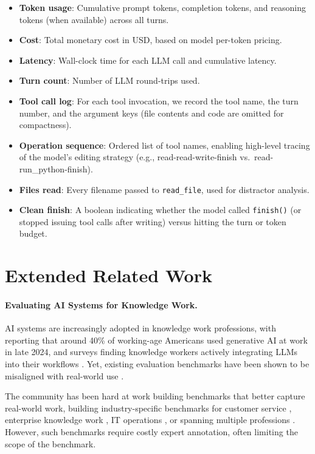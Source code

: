 \documentclass{article} %
\begin{document}
\begin{itemize}
    \item \textbf{Token usage}: Cumulative prompt tokens, completion tokens, and reasoning tokens (when available) across all turns.
    \item \textbf{Cost}: Total monetary cost in USD, based on model per-token pricing.
    \item \textbf{Latency}: Wall-clock time for each LLM call and cumulative latency.
    \item \textbf{Turn count}: Number of LLM round-trips used.
    \item \textbf{Tool call log}: For each tool invocation, we record the tool name, the turn number, and the argument keys (file contents and code are omitted for compactness).
    \item \textbf{Operation sequence}: Ordered list of tool names, enabling high-level tracing of the model's editing strategy (e.g., read-read-write-finish vs.\ read-run\_python-finish).
    \item \textbf{Files read}: Every filename passed to \texttt{read\_file}, used for distractor analysis.
    \item \textbf{Clean finish}: A boolean indicating whether the model called \texttt{finish()} (or stopped issuing tool calls after writing) versus hitting the turn or token budget.
\end{itemize}


\section{Extended Related Work} \label{app:extended_rel_work}

\paragraph{Evaluating AI Systems for Knowledge Work.}

AI systems are increasingly adopted in knowledge work professions, with \citet{Bick2024TheRA} reporting that around 40\% of working-age Americans used generative AI at work in late 2024, and surveys finding knowledge workers actively integrating LLMs into their workflows \cite{Brachman2024HowKW,Ulloa2025ProductMP}. Yet, existing evaluation benchmarks have been shown to be misaligned with real-world use \cite{Wang2026HowWD}.

The community has been hard at work building benchmarks that better capture real-world work, building industry-specific benchmarks for customer service \cite{Huang2024CRMArenaUT,Yao2024taubenchAB}, enterprise knowledge work \cite{Drouin2024WorkArenaHC,Xu2024TheAgentCompanyBL}, IT operations \cite{Jha2025ITBenchEA}, or spanning multiple professions \cite{Chen2025xbenchTA,Patwardhan2025GDPvalEA,Mazeika2025RemoteLI}. However, such benchmarks require costly expert annotation, often limiting the scope of the benchmark.
\end{document}
